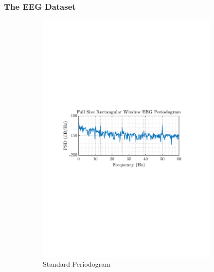 \documentclass[12pt]{article}
\numberwithin{equation}{section}
\begin{document}
	\subsubsection{The EEG Dataset}
	
	\begin{figure}[H]
		\centering
		\begin{subfigure}{0.49\textwidth}
			\centering
			\includegraphics[trim={2.2cm 11.2cm 3.15cm  11.2cm}, clip, width=\textwidth]{../MATLAB/figures/q1_2b_fig01.pdf} 
			\captionsetup{justification=centering}
			\caption{Standard Periodogram}
		\end{subfigure}
		\begin{subfigure}{0.49\textwidth}
			\centering

\end{subfigure}
\end{figure}
\end{document}
